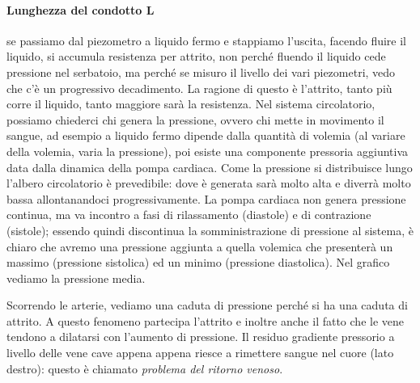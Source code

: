 \documentclass[a4paper,12pt]{article}
\begin{document}
\paragraph{Lunghezza del condotto L} se passiamo dal piezometro a liquido fermo e stappiamo l'uscita, facendo fluire il liquido, si accumula resistenza per attrito, non perché fluendo il liquido cede pressione nel serbatoio, ma perché se misuro il livello dei vari piezometri, vedo che c'è un progressivo decadimento. La ragione di questo è l'attrito, tanto più corre il liquido, tanto maggiore sarà la resistenza. Nel sistema circolatorio, possiamo chiederci chi genera la pressione, ovvero chi mette in movimento il sangue, ad esempio a liquido fermo dipende dalla quantità di volemia (al variare della volemia, varia la pressione), poi esiste una componente pressoria aggiuntiva data dalla dinamica della pompa cardiaca. Come la pressione si distribuisce lungo l'albero circolatorio è prevedibile: dove è generata sarà molto alta e diverrà molto bassa allontanandoci progressivamente. La pompa cardiaca non genera pressione continua, ma va incontro a fasi di rilassamento (diastole) e di contrazione (sistole); essendo quindi discontinua la somministrazione di pressione al sistema, è chiaro che avremo una pressione aggiunta a quella volemica che presenterà un massimo (pressione sistolica) ed un minimo (pressione diastolica). Nel grafico vediamo la pressione media.

Scorrendo le arterie, vediamo una caduta di pressione perché si ha una caduta di attrito.  A questo fenomeno partecipa l'attrito e inoltre anche il fatto che le vene tendono a dilatarsi con l'aumento di pressione. Il residuo gradiente pressorio a livello delle vene cave appena appena riesce a rimettere sangue nel cuore (lato destro): questo è chiamato \emph{problema del ritorno venoso}.
\end{document}
